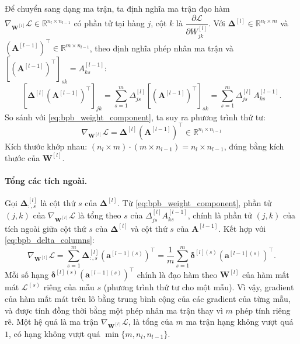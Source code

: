 Để chuyển sang dạng ma trận, ta định nghĩa ma trận đạo hàm $\nabla_{\mathbf{W}^{[l]}}\mathcal{L} \in \mathbb{R}^{n_l \times n_{l-1}}$ có phần tử tại hàng $j$, cột $k$ là $\dfrac{\partial\mathcal{L}}{\partial W_{jk}^{[l]}}$. Với $\boldsymbol{\Delta}^{[l]} \in \mathbb{R}^{n_l \times m}$ và $\left(\mathbf{A}^{[l-1]}\right)^{\top} \in \mathbb{R}^{m \times n_{l-1}}$, theo định nghĩa phép nhân ma trận và $\left[\left(\mathbf{A}^{[l-1]}\right)^{\top}\right]_{sk} = A_{ks}^{[l-1]}$:
\begin{equation}
\left[\boldsymbol{\Delta}^{[l]}\left(\mathbf{A}^{[l-1]}\right)^{\top}\right]_{jk} = \sum_{s=1}^{m}\Delta_{js}^{[l]}\left[\left(\mathbf{A}^{[l-1]}\right)^{\top}\right]_{sk} = \sum_{s=1}^{m}\Delta_{js}^{[l]}\,A_{ks}^{[l-1]}.
\end{equation}
So sánh với \eqref{eq:bpb_weight_component}, ta suy ra phương trình thứ tư:
\begin{equation}
\boxed{
\nabla_{\mathbf{W}^{[l]}}\mathcal{L} = \boldsymbol{\Delta}^{[l]}\left(\mathbf{A}^{[l-1]}\right)^{\top} \in \mathbb{R}^{n_l \times n_{l-1}}
}
\label{eq:bpb_weight_matrix}
\end{equation}
Kích thước khớp nhau: $(n_l \times m)\cdot(m \times n_{l-1}) = n_l \times n_{l-1}$, đúng bằng kích thước của $\mathbf{W}^{[l]}$.
 
\paragraph{Tổng các tích ngoài.} %
Gọi $\boldsymbol{\Delta}^{[l]}_{:,s}$ là cột thứ $s$ của $\boldsymbol{\Delta}^{[l]}$. Từ \eqref{eq:bpb_weight_component}, phần tử $(j,k)$ của $\nabla_{\mathbf{W}^{[l]}}\mathcal{L}$ là tổng theo $s$ của $\Delta_{js}^{[l]}A_{ks}^{[l-1]}$, chính là phần tử $(j,k)$ của tích ngoài giữa cột thứ $s$ của $\boldsymbol{\Delta}^{[l]}$ và cột thứ $s$ của $\mathbf{A}^{[l-1]}$. Kết hợp với \eqref{eq:bpb_delta_columns}:
\begin{equation}
\nabla_{\mathbf{W}^{[l]}}\mathcal{L} = \sum_{s=1}^{m}\boldsymbol{\Delta}^{[l]}_{:,s}\left(\mathbf{a}^{[l-1](s)}\right)^{\top} = \frac{1}{m}\sum_{s=1}^{m}\boldsymbol{\delta}^{[l](s)}\left(\mathbf{a}^{[l-1](s)}\right)^{\top}.
\label{eq:bpb_weight_sum_outer}
\end{equation}
Mỗi số hạng $\boldsymbol{\delta}^{[l](s)}\left(\mathbf{a}^{[l-1](s)}\right)^{\top}$ chính là đạo hàm theo $\mathbf{W}^{[l]}$ của hàm mất mát $\mathcal{L}^{(s)}$ riêng của mẫu $s$ (phương trình thứ tư cho một mẫu). Vì vậy, gradient của hàm mất mát trên lô bằng trung bình cộng của các gradient của từng mẫu, và được tính đồng thời bằng một phép nhân ma trận thay vì $m$ phép tính riêng rẽ. Một hệ quả là ma trận $\nabla_{\mathbf{W}^{[l]}}\mathcal{L}$, là tổng của $m$ ma trận hạng không vượt quá $1$, có hạng không vượt quá $\min\{m, n_l, n_{l-1}\}$.
 
